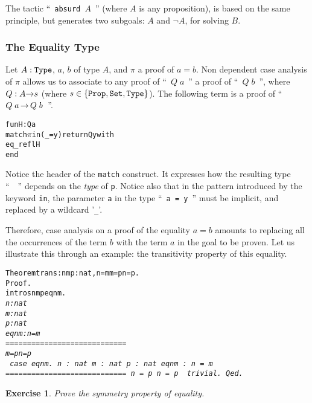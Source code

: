 \documentclass[11pt]{article}
\newtheorem{exercise}{Exercise}[section]
\begin{document}
The tactic ``~\texttt{absurd $A$}~'' (where $A$ is any proposition),
is based on the same principle, but
generates two subgoals: $A$ and $\neg A$, for solving $B$.

\subsubsection{The Equality Type}

Let $A:\texttt{Type}$, $a$, $b$ of type $A$, and $\pi$ a proof of
$a=b$. Non dependent case analysis of $\pi$ allows us to
associate to any proof  of ``~$Q\;a$~'' a proof of ``~$Q\;b$~'',
where $Q:A\mbox{$\rightarrow$}{} s$ (where $s\in\{\texttt{Prop}, \texttt{Set}, \texttt{Type}\}$).
The following term is a proof  of ``~$Q\;a\, \mbox{$\rightarrow$}{}\, Q\;b$~''.

\begin{alltt}
fun H : Q a {\funarrow}
  match \(\pi\) in (_ = y) return Q y with
     eq_refl {\funarrow} H
  end
\end{alltt}
Notice the header of the \texttt{match} construct.
It expresses how the resulting type ``~~'' depends on
the \emph{type} of \texttt{p}.
Notice also that in the pattern introduced by the keyword \texttt{in},
the parameter \texttt{a} in the type ``~\texttt{a = y}~'' must be
implicit, and replaced by a wildcard '\texttt{\_}'.


Therefore, case analysis on a proof of the equality $a=b$
amounts to replacing all the occurrences of the term $b$ with the term
$a$ in the goal to be proven. Let us illustrate this through an
example: the transitivity property of this equality.
\begin{alltt}
Theorem trans : {\prodsym} n m p:nat, n=m \arrow{} m=p \arrow{} n=p.
Proof.
 intros n m p eqnm.
\it{}
  n : nat
  m : nat
  p : nat
  eqnm : n = m
  ============================
   m = p {\arrow} n = p
\tt{} case eqnm.
\it{}
  n : nat
  m : nat
  p : nat
  eqnm : n = m
  ============================
   n = p {\arrow} n = p
\tt{} trivial.
Qed.
\end{alltt}


\begin{exercise}
Prove the symmetry property of  equality.
\end{exercise}
\end{document}
